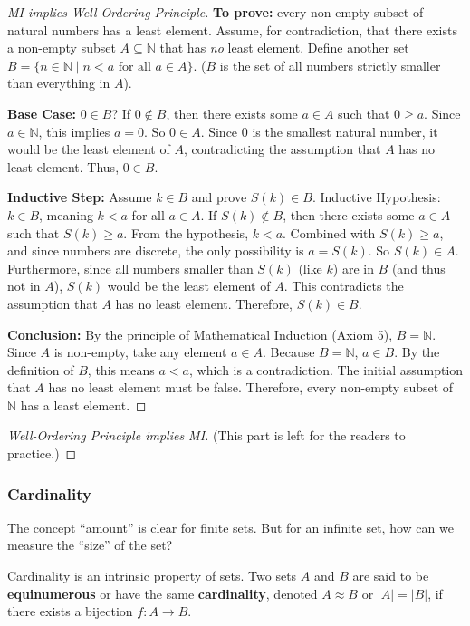 \begin{proof}[MI implies Well-Ordering Principle]
\textbf{To prove:} every non-empty subset of natural numbers has a least element.
Assume, for contradiction, that there exists a non-empty subset $A \subseteq \mathbb{N}$ that has \emph{no} least element.
Define another set $B = \{ n \in \mathbb{N} \mid n < a \text{ for all } a \in A \}$. ($B$ is the set of all numbers strictly smaller than everything in $A$).

\textbf{Base Case:} $0 \in B$?
If $0 \notin B$, then there exists some $a \in A$ such that $0 \ge a$. Since $a \in \mathbb{N}$, this implies $a=0$. So $0 \in A$. Since 0 is the smallest natural number, it would be the least element of $A$, contradicting the assumption that $A$ has no least element. Thus, $0 \in B$.

\textbf{Inductive Step:} Assume $k \in B$ and prove $S(k) \in B$.
Inductive Hypothesis: $k \in B$, meaning $k < a$ for all $a \in A$.
If $S(k) \notin B$, then there exists some $a \in A$ such that $S(k) \ge a$.
From the hypothesis, $k < a$. Combined with $S(k) \ge a$, and since numbers are discrete, the only possibility is $a = S(k)$.
So $S(k) \in A$. Furthermore, since all numbers smaller than $S(k)$ (like $k$) are in $B$ (and thus not in $A$), $S(k)$ would be the least element of $A$.
This contradicts the assumption that $A$ has no least element. Therefore, $S(k) \in B$.

\textbf{Conclusion:} By the principle of Mathematical Induction (Axiom 5), $B = \mathbb{N}$.
Since $A$ is non-empty, take any element $a \in A$. Because $B = \mathbb{N}$, $a \in B$.
By the definition of $B$, this means $a < a$, which is a contradiction.
The initial assumption that $A$ has no least element must be false.
Therefore, every non-empty subset of $\mathbb{N}$ has a least element.
\end{proof}

\begin{proof}[Well-Ordering Principle implies MI]
(This part is left for the readers to practice.)
\end{proof}

\subsubsection*{Cardinality}
The concept “amount” is clear for finite sets. But for an infinite set, how can we measure the “size” of the set?
\begin{definition}
Cardinality is an intrinsic property of sets. Two sets $A$ and $B$ are said to be \textbf{equinumerous} or have the same \textbf{cardinality}, denoted $A \approx B$ or $|A|=|B|$, if there exists a bijection $f: A \to B$.
\end{definition}

